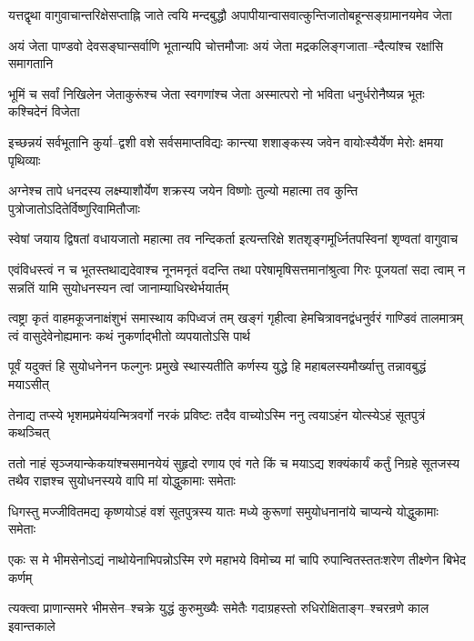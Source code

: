 \twolineshloka
{यत्तद्वृथा वागुवाचान्तरिक्षेसप्ताह्नि जाते त्वयि मन्दबुद्धौ}
{अपापीयान्वासवात्कुन्तिजातोबहून्सङ्ग्रामानयमेव जेता}


\twolineshloka
{अयं जेता पाण्डवो देवसङ्घान्सर्वाणि भूतान्यपि चोत्तमौजाः}
{अयं जेता मद्रकलिङ्गजाता--न्दैत्यांश्च रक्षांसि समागतानि}


\twolineshloka
{भूमिं च सर्वां निखिलेन जेताकुरूंश्च जेता स्वगणांश्च जेता}
{अस्मात्परो नो भविता धनुर्धरोनैष्यन्न भूतः कश्चिदेनं विजेता}


\twolineshloka
{इच्छन्नयं सर्वभूतानि कुर्या--द्वशी वशे सर्वसमाप्तविद्यः}
{कान्त्या शशाङ्कस्य जवेन वायोःस्यैर्येण मेरोः क्षमया पृथिव्याः}


\twolineshloka
{अग्नेश्च तापे धनदस्य लक्ष्म्याशौर्येण शक्रस्य जयेन विष्णोः}
{तुल्यो महात्मा तव कुन्ति पुत्रोजातोऽदितेर्विष्णुरिवामितौजाः}


\twolineshloka
{स्वेषां जयाय द्विषतां वधायजातो महात्मा तव नन्दिकर्ता}
{इत्यन्तरिक्षे शतशृङ्गमूर्ध्नितपस्विनां शृण्वतां वागुवाच}


एवंविधस्त्वं न च भूतस्तथाद्यदेवाश्च नूनमनृतं वदन्ति
\twolineshloka
{तथा परेषामृषिसत्तमानांश्रुत्वा गिरः पूजयतां सदा त्वाम्}
{न सन्नतिं यामि सुयोधनस्यन त्वां जानाम्याधिरथेर्भयार्तम्}


\threelineshloka
{त्वष्ट्रा कृतं वाहमकूजनाक्षंशुभं समास्थाय कपिध्वजं तम्}
{खङ्गं गृहीत्वा हेमचित्रावनद्वंधनुर्वरं गाण्डिवं तालमात्रम्}
{त्वं वासुदेवेनोह्यमानः कथं नुकर्णाद्भीतो व्यपयातोऽसि पार्थ}


\twolineshloka
{पूर्वं यदुक्तं हि सुयोधनेनन फल्गुनः प्रमुखे स्थास्यतीति}
{कर्णस्य युद्धे हि महाबलस्यमौर्ख्यात्तु तन्नावबुद्धं मयाऽसीत्}


\twolineshloka
{तेनाद्य तप्स्ये भृशमप्रमेयंयन्मित्रवर्गो नरकं प्रविष्टः}
{तदैव वाच्योऽस्मि ननु त्वयाऽहंन योत्स्येऽहं सूतपुत्रं कथञ्चित्}


ततो नाहं सृञ्जयान्केकयांश्चसमानयेयं सुहृदो रणाय
\twolineshloka
{एवं गते किं च मयाऽद्य शक्यंकार्यं कर्तुं निग्रहे सूतजस्य}
{तथैव राज्ञश्च सुयोधनस्यये वापि मां योद्धुकामाः समेताः}


\twolineshloka
{धिगस्तु मज्जीवितमद्य कृष्णयोऽहं वशं सूतपुत्रस्य यातः}
{मध्ये कुरूणां समुयोधनानांये चाप्यन्ये योद्धुकामाः समेताः}


\twolineshloka
{एकः स मे भीमसेनोऽद्यं नाथोयेनाभिपन्नोऽस्मि रणे महाभये}
{विमोच्य मां चापि रुपान्वितस्ततःशरेण तीक्ष्णेन बिभेद कर्णम्}


\twolineshloka
{त्यक्त्वा प्राणान्समरे भीमसेन--श्चक्रे युद्धं कुरुमुख्यैः समेतैः}
{गदाग्रहस्तो रुधिरोक्षिताङ्ग--श्चरन्रणे काल इवान्तकाले}


